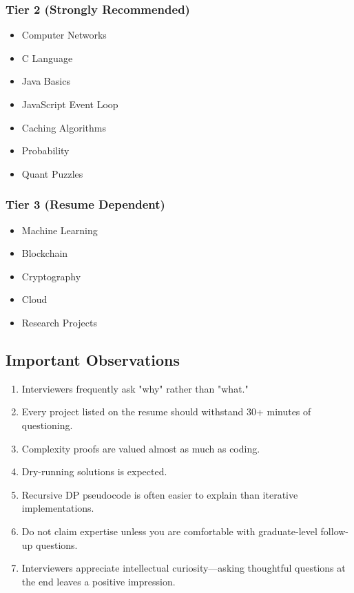 \documentclass[11pt,a4paper]{article}
\begin{document}
\subsubsection{Tier 2 (Strongly Recommended)}

\begin{itemize}
	\item Computer Networks
	\item C Language
	\item Java Basics
	\item JavaScript Event Loop
	\item Caching Algorithms
	\item Probability
	\item Quant Puzzles
\end{itemize}

\subsubsection{Tier 3 (Resume Dependent)}

\begin{itemize}
	\item Machine Learning
	\item Blockchain
	\item Cryptography
	\item Cloud
	\item Research Projects
\end{itemize}


\subsection{Important Observations}

\begin{enumerate}
	\item Interviewers frequently ask "why" rather than "what."
	\item Every project listed on the resume should withstand 30+ minutes of questioning.
	\item Complexity proofs are valued almost as much as coding.
	\item Dry-running solutions is expected.
	\item Recursive DP pseudocode is often easier to explain than iterative implementations.
	\item Do not claim expertise unless you are comfortable with graduate-level follow-up questions.
	\item Interviewers appreciate intellectual curiosity---asking thoughtful questions at the end leaves a positive impression.
\end{enumerate}
\end{document}
